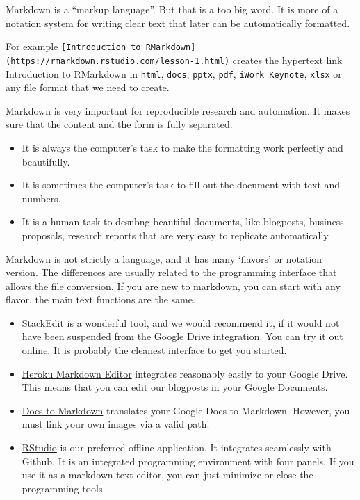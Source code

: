 \documentclass[
  a4paper,
  openany, a4paper, oneside]{book}
\begin{document}
Markdown is a ``markup language''. But that is a too big word. It is more of a notation system for writing clear text that later can be automatically formatted.

For example \texttt{{[}Introduction\ to\ RMarkdown{]}(https://rmarkdown.rstudio.com/lesson-1.html)} creates the hypertext link \href{https://rmarkdown.rstudio.com/lesson-1.html}{Introduction to RMarkdown} in \texttt{html}, \texttt{docs}, \texttt{pptx}, \texttt{pdf}, \texttt{iWork\ Keynote}, \texttt{xlsx} or any file format that we need to create.

Markdown is very important for reproducible research and automation. It makes sure that the content and the form is fully separated.

\begin{itemize}
\item
  It is always the computer's task to make the formatting work perfectly and beautifully.
\item
  It is sometimes the computer's task to fill out the document with text and numbers.
\item
  It is a human task to desnbng beautiful documents, like blogposts, business proposals, research reports that are very easy to replicate automatically.
\end{itemize}

Markdown is not strictly a language, and it has many `flavors' or notation version. The differences are usually related to the programming interface that allows the file conversion. If you are new to markdown, you can start with any flavor, the main text functions are the same.

\begin{itemize}
\item
  \href{https://stackedit.io/}{StackEdit} is a wonderful tool, and we would recommend it, if it would not have been suspended from the Google Drive integration. You can try it out online. It is probably the cleanest interface to get you started.
\item
  \href{https://thumbsdb.herokuapp.com/markdown/}{Heroku Markdown Editor} integrates reasonably easily to your Google Drive. This means that you can edit our blogposts in your Google Documents.
\item
  \href{https://gsuite.google.com/marketplace/app/docs_to_markdown/700168918607}{Docs to Markdown} translates your Google Docs to Markdown. However, you must link your own images via a valid path.
\item
  \href{https://rstudio.com/}{RStudio} is our preferred offline application. It integrates seamlessly with Github. It is an integrated programming environment with four panels. If you use it as a markdown text editor, you can just minimize or close the programming tools.
\end{itemize}
\end{document}
